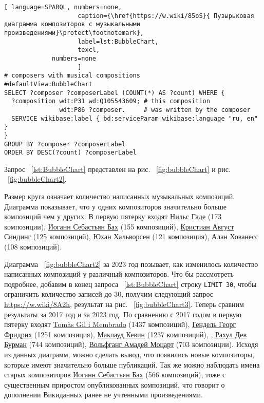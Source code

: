 \begin{lstlisting}[ language=SPARQL, numbers=none,
                    caption={\href{https://w.wiki/85oS}{ Пузырьковая диаграмма композиторов с музыкальными произведениями}\protect\footnotemark},
                    label=lst:BubbleChart,
                    texcl,
	         numbers=none
                    ]
# composers with musical compositions
#defaultView:BubbleChart
SELECT ?composer ?composerLabel (COUNT(*) AS ?count) WHERE {
  ?composition wdt:P31 wd:Q105543609; # this composition
               wdt:P86 ?composer.     # was written by the composer
  SERVICE wikibase:label { bd:serviceParam wikibase:language "ru, en" }
}
GROUP BY ?composer ?composerLabel
ORDER BY DESC(?count) ?composerLabel
\end{lstlisting}%

Запрос ~\ref{lst:BubbleChart} представлен на рис. ~\ref{fig:bubbleChart} и рис. ~\ref{fig:bubbleChart2}.

Размер круга означает количество написанных музыкальных композиций. Диаграмма показывает, что у одних композиторов значительно больше композиций чем у других. В первую пятерку входят \href{https://ru.wikipedia.org/wiki/Гаде,_Нильс}{Нильс Гаде} (\num{173} композиции), \href{https://ru.wikipedia.org/wiki/Бах,_Иоганн_Себастьян}{Иоганн Себастьян Бах} (\num{155} композиций), \href{https://ru.wikipedia.org/wiki/Синдинг,_Кристиан_Август}{Кристиан Август Синдинг} (\num{125} композиций), \href{https://ru.wikipedia.org/wiki/Хальворсен,_Юхан}{Юхан Хальворсен} (\num{121} композиция), \href{https://ru.wikipedia.org/wiki/Хованесс,_Алан}{Алан Хованесс} (\num{108} композиций).

Диаграмма ~\ref{fig:bubbleChart2} за 2023 год позывает, как изменилось количество написанных композиций у различный композиторов. Что бы рассмотреть подробнее, добавим в конец запроса ~\ref{lst:BubbleChart} строку  \lstinline|LIMIT 30|, чтобы ограничить количество записей до 30, получим следующий запрос \href{https://w.wiki/8A2h}{https://w.wiki/8A2h}, результат на рис. ~\ref{fig:bubbleChart3}. Теперь сравним результаты за 2017 год и за 2023 год.
По сравнению с 2017 годом в первую пятерку входят \href{https://ca.wikipedia.org/wiki/Tomàs_Gil_i_Membrado}{Tomàs Gil i Membrado} (\num{1437} композиций), \href{https://ru.wikipedia.org/wiki/Гендель,_Георг_Фридрих}{Гендель Георг Фридрих} (\num{1251} композиция), \href{https://ru.wikipedia.org/wiki/Маклауд,_Кевин}{Маклауд Кевин} (\num{1237} композиций), , \href{https://en.wikipedia.org/wiki/R._D._Burman}{Рахул Дев Бурман} (\num{744} композиций), \href{https://ru.wikipedia.org/wiki/Моцарт,_Вольфганг_Амадей}{Вольфганг Амадей Моцарт} (\num{703} композиции). Исходя из данных диаграмм, можно сделать вывод, что появились новые композиторы, которые имеют значительно больше публикаций. Так же можно наблюдать имена старых композиторов \href{https://ru.wikipedia.org/wiki/Бах,_Иоганн_Себастьян}{Иоганн Себастьян Бах} (\num{566} композиций), тоже с существенным приростом опубликованных композиций, что говорит о дополнении Викиданных ранее не учтенными произведениями.

